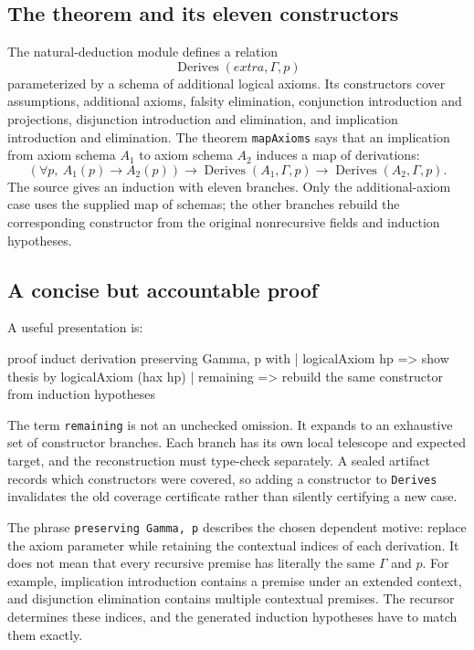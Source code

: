 \documentclass[11pt,a4paper]{article}
\theoremstyle{remark}
\newcommand{\ty}[1]{\texttt{#1}}
\begin{document}
\subsection{The theorem and its eleven constructors}
The natural-deduction module defines a relation
\[
\operatorname{Derives}(\mathit{extra},\Gamma,p)
\]
parameterized by a schema of additional logical axioms. Its constructors cover assumptions, additional axioms, falsity elimination, conjunction introduction and projections, disjunction introduction and elimination, and implication introduction and elimination. The theorem \ty{mapAxioms} says that an implication from axiom schema $A_1$ to axiom schema $A_2$ induces a map of derivations:
\begin{equation}\label{eq:mapaxioms}
\left(\forall p,\ A_1(p)\to A_2(p)\right)
\to\operatorname{Derives}(A_1,\Gamma,p)
\to\operatorname{Derives}(A_2,\Gamma,p).
\end{equation}
The source gives an induction with eleven branches. Only the additional-axiom case uses the supplied map of schemas; the other branches rebuild the corresponding constructor from the original nonrecursive fields and induction hypotheses.\cite{proveit-nd}

\subsection{A concise but accountable proof}
A useful presentation is:
\Needspace{94pt}
\begin{code}
proof
  induct derivation preserving Gamma, p with
  | logicalAxiom hp =>
      show thesis by logicalAxiom (hax hp)
  | remaining =>
      rebuild the same constructor from induction hypotheses
\end{code}
The term \ty{remaining} is not an unchecked omission. It expands to an exhaustive set of constructor branches. Each branch has its own local telescope and expected target, and the reconstruction must type-check separately. A sealed artifact records which constructors were covered, so adding a constructor to \ty{Derives} invalidates the old coverage certificate rather than silently certifying a new case.

The phrase \ty{preserving Gamma, p} describes the chosen dependent motive: replace the axiom parameter while retaining the contextual indices of each derivation. It does not mean that every recursive premise has literally the same $\Gamma$ and $p$. For example, implication introduction contains a premise under an extended context, and disjunction elimination contains multiple contextual premises. The recursor determines these indices, and the generated induction hypotheses have to match them exactly.
\end{document}
